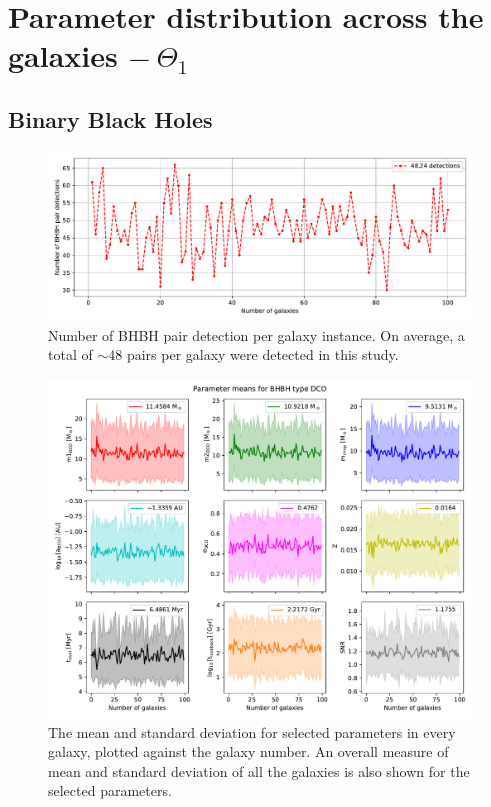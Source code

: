 \section{Parameter distribution across the galaxies $-\ \Theta_1$}
\label{sec:paramter-distribution-across-the-galaxies}
\subsection{Binary Black Holes}
\begin{figure}[h]
    \centering
    \includegraphics[width=\columnwidth]{analysis_data/004__images_for_latex/BHBH_n_detections}
    \caption{Number of BHBH pair detection per galaxy instance. On average, a total of $\sim$48 pairs per galaxy were detected in this study.}
    \label{fig:bhbhndetections}
\end{figure}

\begin{figure}[h]
    \centering
    \includegraphics[width=\columnwidth]{analysis_data/004__images_for_latex/BHBH_n_galaxy_mean_plot}
    \caption{The mean and standard deviation for selected parameters in every galaxy, plotted against the galaxy number. An overall measure of mean and standard deviation of all the galaxies is also shown for the selected parameters.}
    \label{fig:bhbh_n_galaxy_mean_plot}
\end{figure}

